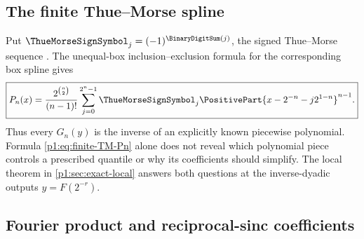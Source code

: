 \documentclass[11pt,oneside]{article}
\numberwithin{equation}{section}
\theoremstyle{definition}
\theoremstyle{remark}
\newcommand{\Fn}{P_n}
\newcommand{\Gn}{G_n}
\begin{document}
\subsection{The finite Thue--Morse spline}

Put $\ThueMorseSignSymbol_j=(-1)^{\BinaryDigitSum(j)}$, the signed Thue--Morse sequence
\cite{p1:AlloucheShallit}.  The unequal-box inclusion--exclusion formula for the
corresponding box spline \cite{p1:deBoorSplines} gives
\begin{equation}
 \boxed{
 \Fn(x)=\frac{2^{\binom n2}}{(n-1)!}
 \sum_{j=0}^{2^n-1}\ThueMorseSignSymbol_j
 \PositivePart{x-2^{-n}-j2^{1-n}}^{n-1}.}
 \label{p1:eq:finite-TM-Pn}
\end{equation}
Thus every $\Gn(y)$ is the inverse of an explicitly known piecewise polynomial.  Formula
\eqref{p1:eq:finite-TM-Pn} alone does not reveal which polynomial piece controls a prescribed
quantile or why its coefficients should simplify.  The local theorem in \cref{p1:sec:exact-local}
answers both questions at the inverse-dyadic outputs $y=F(2^{-r})$.

\subsection{Fourier product and reciprocal-sinc coefficients}
\end{document}
